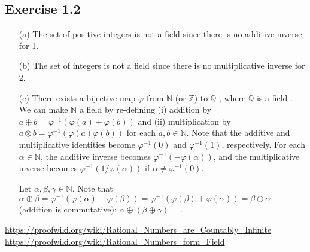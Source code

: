 \documentclass{article}
\begin{document}
\subsection{Exercise 1.2}
\begin{itemize}
  \item[(a)] The set of positive integers is not a field since there is no additive inverse for 1.
  \item[(b)] The set of integers is not a field since there is no multiplicative inverse for 2.
  \item[(c)] There exists a bijective map $\varphi$ from $\mathbb{N}$ (or $\mathbb{Z}$) to $\mathbb{Q}$ \cite{Q_countable}, where $\mathbb{Q}$ is a field \cite{Q_field}.
  	We can make $\mathbb{N}$ a field by re-defining (i) addition by $a \oplus b = \varphi^{-1} (\varphi(a) + \varphi(b))$ and (ii) multiplication by $a \otimes b = \varphi^{-1}(\varphi(a)\varphi(b))$ for each $a, b \in \mathbb{N}$.
	Note that the additive and multiplicative identities become $\varphi^{-1}(0)$ and $\varphi^{-1}(1)$, respectively.
	For each $\alpha\in\mathbb{N}$, the additive inverse becomes $\varphi^{-1}(-\varphi(\alpha))$, and the multiplicative inverse becomes $\varphi^{-1}(1/\varphi(\alpha))$ if $\alpha\ne\varphi^{-1}(0)$.
	
	Let $\alpha,\beta,\gamma\in\mathbb{N}$.
	Note that $\alpha \oplus \beta = \varphi^{-1} (\varphi(\alpha) + \varphi(\beta)) = \varphi^{-1} (\varphi(\beta) + \varphi(\alpha)) = \beta \oplus \alpha$ (addition is commutative); $\alpha \oplus (\beta \oplus \gamma) = $.
\end{itemize}

\begin{thebibliography}{9}
 \url{https://proofwiki.org/wiki/Rational_Numbers_are_Countably_Infinite}
 \url{https://proofwiki.org/wiki/Rational_Numbers_form_Field}
\end{thebibliography}
\end{document}
